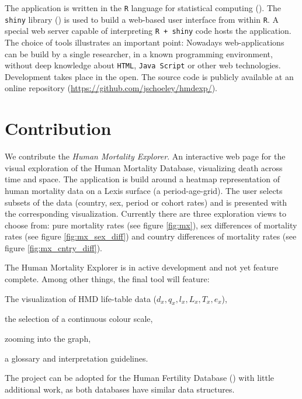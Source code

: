 \documentclass[
  12pt
]{scrartcl}
\begin{document}
The application is written in the \texttt{R} language for statistical computing (\cite{RCT2014}). The \texttt{shiny} library (\cite{Chang2015}) is used to build a web-based user interface from within \texttt{R}. A special web server capable of interpreting \texttt{R + shiny} code hosts the application. The choice of tools illustrates an important point: Nowadays web-applications can be build by a single researcher, in a known programming environment, without deep knowledge about \texttt{HTML}, \texttt{Java Script} or other web technologies. Development takes place in the open. The source code is publicly available at an online repository (\url{https://github.com/jschoeley/hmdexp/}).

\section*{Contribution}

We contribute the \emph{Human Mortality Explorer}. An interactive web page for the visual exploration of the Human Mortality Database, visualizing death across time and space. The application is build around a heatmap representation of human mortality data on a Lexis surface (a period-age-grid). The user selects subsets of the data (country, sex, period or cohort rates) and is presented with the corresponding visualization. Currently there are three exploration views to choose from: pure mortality rates (see figure \ref{fig:mx}), sex differences of mortality rates (see figure \ref{fig:mx_sex_diff}) and country differences of mortality rates (see figure \ref{fig:mx_cntry_diff}).

The Human Mortality Explorer is in active development and not yet feature complete. Among other things, the final tool will feature:

\begin{compactenum}
  \item The visualization of HMD life-table data ($d_x, q_x, l_x, L_x, T_x, e_x$),
  \item the selection of a continuous colour scale,
  \item zooming into the graph,
  \item a glossary and interpretation guidelines.
\end{compactenum}

The project can be adopted for the Human Fertility Database (\cite{HFDT2015}) with little additional work, as both databases have similar data structures.
\end{document}
